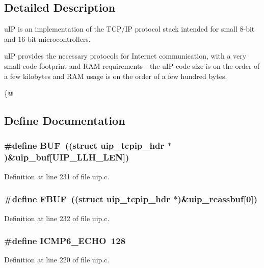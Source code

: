 \subsection{Detailed Description}
uIP is an implementation of the TCP/IP protocol stack intended for small 8-\/bit and 16-\/bit microcontrollers.

uIP provides the necessary protocols for Internet communication, with a very small code footprint and RAM requirements -\/ the uIP code size is on the order of a few kilobytes and RAM usage is on the order of a few hundred bytes.

\{@ 

\subsection{Define Documentation}
\hypertarget{group__uip_ga24f52ac52d6e714cb04a5aa01be3bdd0}{
\subsubsection[{BUF}]{\setlength{\rightskip}{0pt plus 5cm}\#define BUF~((struct {\bf uip\_\-tcpip\_\-hdr} $\ast$)\&{\bf uip\_\-buf}\mbox{[}UIP\_\-LLH\_\-LEN\mbox{]})}}
\label{group__uip_ga24f52ac52d6e714cb04a5aa01be3bdd0}


Definition at line 231 of file uip.c.

\hypertarget{group__uip_ga96544dedc1cdc71ad2ad54bf1d5e5433}{
\subsubsection[{FBUF}]{\setlength{\rightskip}{0pt plus 5cm}\#define FBUF~((struct {\bf uip\_\-tcpip\_\-hdr} $\ast$)\&uip\_\-reassbuf\mbox{[}0\mbox{]})}}
\label{group__uip_ga96544dedc1cdc71ad2ad54bf1d5e5433}


Definition at line 232 of file uip.c.

\hypertarget{group__uip_ga4cc3e223b63f27b546d62e9a258dba5a}{
\subsubsection[{ICMP6\_\-ECHO}]{\setlength{\rightskip}{0pt plus 5cm}\#define ICMP6\_\-ECHO~128}}
\label{group__uip_ga4cc3e223b63f27b546d62e9a258dba5a}


Definition at line 220 of file uip.c.


